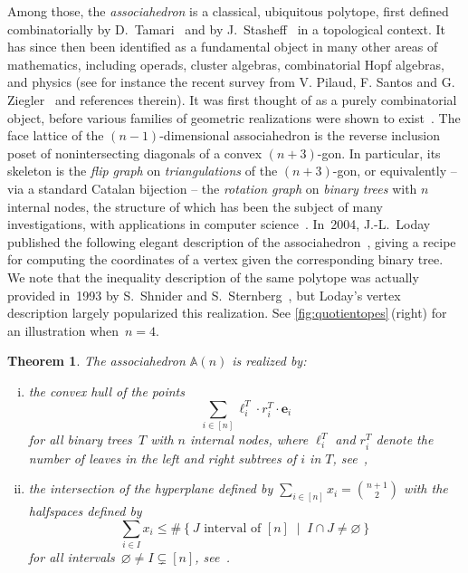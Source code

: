 \documentclass{amsart}
\newtheorem{theorem}{Theorem}%
\theoremstyle{definition}
\newcommand{\R}{\mathbb{R}} %
\renewcommand{\b}[1]{{\boldsymbol{#1}}} %
\newcommand{\set}[2]{\left\{ #1 \;\middle|\; #2 \right\}} %
\newcommand{\darkblue}{\color{darkblue}} %
\newcommand{\defn}[1]{\textsl{\darkblue #1}} %
\newcommand{\polytope}[1]{\mathds{#1}} %
\newcommand{\Asso}{\polytope{A}} %
\begin{document}
Among those, the \defn{associahedron} is a classical, ubiquitous polytope, first defined combinatorially by D.~Tamari~\cite{T51} and by J.~Stasheff~\cite{S63} in a topological context.
It has since then been identified as a fundamental object in many other areas of mathematics, including operads, cluster algebras, combinatorial Hopf algebras, and physics (see for instance the recent survey from V. Pilaud, F. Santos and G. Ziegler~\cite{PilaudSantosZiegler} and references therein).
It was first thought of as a purely combinatorial object, before various families of geometric realizations were shown to exist~\cite{MR1022776,MR1941227,MR2108555,MR3437894,MR2321739}.
The face lattice of the $(n-1)$-dimensional associahedron is the reverse inclusion poset of nonintersecting diagonals of a convex $(n+3)$-gon.
In particular, its skeleton is the \defn{flip graph} on \defn{triangulations} of the $(n+3)$-gon, or equivalently -- via a standard Catalan bijection -- the \defn{rotation graph} on \defn{binary trees} with $n$ internal nodes, the structure of which has been the subject of many investigations, with applications in computer science~\cite{MR928904,MR3197650}.
In~2004, J.-L.~Loday published the following elegant description of the associahedron~\cite{MR2108555}, giving a recipe for computing the coordinates of a vertex given the corresponding binary tree.
We note that the inequality description of the same polytope was actually provided in~1993 by S.~Shnider and S.~Sternberg~\cite{ShniderSternberg}, but Loday's vertex description largely popularized this realization.
See \cref{fig:quotientopes}\,(right) for an illustration when~$n = 4$.

\begin{theorem}
  \label{thm:loday}
    The associahedron $\Asso (n)$ is realized by:
  \begin{enumerate}[(i)]
  \item the convex hull of the points
    \[
    \sum_{i\in [n]} \ell^T_i\cdot r^T_i \cdot \b{e}_i
    \]
    for all binary trees~$T$ with $n$ internal nodes, where $\ell^T_i$ and $r^T_i$ denote the number of leaves in the left and right subtrees of $i$ in $T$, see~\cite{MR2108555},
  \item the intersection of the hyperplane defined by $\sum_{i \in [n]} x_i = \binom{n+1}{2}$ with the halfspaces defined by
    \[
    \sum_{i \in I} x_i \le \#\set{J \text{ interval of } [n]}{I \cap J \ne \varnothing}
    \]
    for all intervals~$\varnothing \ne I \subsetneq [n]$, see~\cite{ShniderSternberg}.
  \end{enumerate}
\end{theorem}
\end{document}
